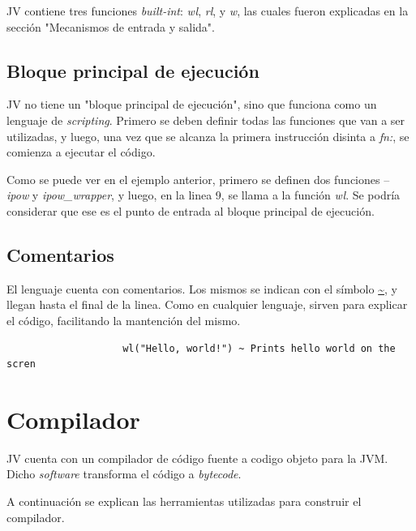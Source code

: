 \documentclass{article}
\begin{document}
                \par JV contiene tres funciones \textit{built-int}: \textit{wl}, \textit{rl}, y \textit{w}, las cuales fueron explicadas en la sección "Mecanismos de entrada y salida".


            \subsection{Bloque principal de ejecución}
                \par JV no tiene un "bloque principal de ejecución", sino que funciona como un lenguaje de \textit{scripting}. Primero se deben definir todas las funciones que van a ser utilizadas, y luego, una vez que se alcanza la primera instrucción disinta a \textit{fn:}, se comienza a ejecutar el código.
                \par Como se puede ver en el ejemplo anterior, primero se definen dos funciones – \textit{ipow} y \textit{ipow\_wrapper}, y luego, en la linea 9, se llama a la función \textit{wl}. Se podría considerar que ese es el punto de entrada al bloque principal de ejecución. 

            \subsection{Comentarios}
                \par El lenguaje cuenta con comentarios. Los mismos se indican con el símbolo \url{~}, y llegan hasta el final de la linea. Como en cualquier lenguaje, sirven para explicar el código, facilitando la mantención del mismo.
                \begin{lstlisting}
                    wl("Hello, world!") ~ Prints hello world on the scren
                \end{lstlisting} 

        \clearpage

    \section{Compilador}
        \par JV cuenta con un compilador de código fuente a codigo objeto para la JVM. Dicho \textit{software} transforma el código a \textit{bytecode}.
        \par A continuación se explican las herramientas utilizadas para construir el compilador.
\end{document}

